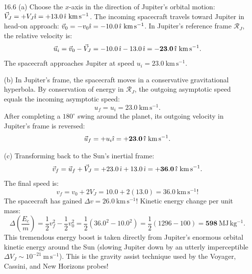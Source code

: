 \begin{tabletworkspace}[6.0cm]
\end{tabletworkspace}

\begin{solution}{16.6}
(a) Choose the $x$-axis in the direction of Jupiter's orbital motion: $\vec{V}_J = +V_J\ihat = +13.0\,\ihat\ \mathrm{km\,s^{-1}}$.
The incoming spacecraft travels toward Jupiter in head-on approach: $\vec{v}_0 = -v_0\hat{\imath} = -10.0\,\hat{\imath}\ \mathrm{km\,s^{-1}}$.
In Jupiter's reference frame $\mathcal{R}_J$, the relative velocity is:
\[
\vec{u}_i = \vec{v}_0 - \vec{V}_J = -10.0\,\hat{\imath} - 13.0\,\hat{\imath} = \mathbf{-23.0\,\hat{\imath}\ \mathrm{km\,s^{-1}}.}
\]
The spacecraft approaches Jupiter at speed $u_i = 23.0\ \mathrm{km\,s^{-1}}$.

(b) In Jupiter's frame, the spacecraft moves in a conservative gravitational hyperbola. By conservation of energy in $\mathcal{R}_J$, the outgoing asymptotic speed equals the incoming asymptotic speed:
\[
u_f = u_i = 23.0\ \mathrm{km\,s^{-1}}.
\]
After completing a $180^\circ$ swing around the planet, its outgoing velocity in Jupiter's frame is reversed:
\[
\vec{u}_f = +u_i\hat{\imath} = \mathbf{+23.0\,\hat{\imath}\ \mathrm{km\,s^{-1}}.}
\]

(c) Transforming back to the Sun's inertial frame:
\[
\vec{v}_f = \vec{u}_f + \vec{V}_J = +23.0\,\hat{\imath} + 13.0\,\hat{\imath} = \mathbf{+36.0\,\hat{\imath}\ \mathrm{km\,s^{-1}}.}
\]
The final speed is:
\[
\boxed{v_f = v_0 + 2V_J = 10.0 + 2(13.0) = \mathbf{36.0\ \mathrm{km\,s^{-1}}!}}
\]
The spacecraft has gained $\Delta v = 26.0\ \mathrm{km\,s^{-1}}$!
Kinetic energy change per unit mass:
\[
\Delta\left(\frac{E_c}{m}\right) = \frac{1}{2}v_f^2 - \frac{1}{2}v_0^2 = \frac{1}{2}(36.0^2 - 10.0^2) = \frac{1}{2}(1296 - 100) = \mathbf{598\ \mathrm{MJ\,kg^{-1}}.}
\]
This tremendous energy boost is taken directly from Jupiter's enormous orbital kinetic energy around the Sun (slowing Jupiter down by an utterly imperceptible $\Delta V_J \sim 10^{-21}\ \mathrm{m\,s^{-1}}$). This is the gravity assist technique used by the Voyager, Cassini, and New Horizons probes!
\end{solution}
